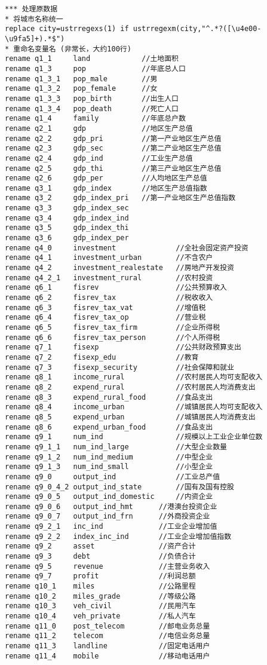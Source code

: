 \begin{lstlisting}[frame=single]
*** 处理原数据
* 将城市名称统一
replace city=ustrregexs(1) if ustrregexm(city,"^.*?([\u4e00-\u9fa5]+).*$")
* 重命名变量名 (非常长，大约100行)
rename q1_1		land			//土地面积
rename q1_3		pop				//年底总人口
rename q1_3_1	pop_male		//男
rename q1_3_2	pop_female		//女
rename q1_3_3	pop_birth		//出生人口
rename q1_3_4	pop_death		//死亡人口
rename q1_4		family			//年底总户数
rename q2_1		gdp				//地区生产总值
rename q2_2		gdp_pri			//第一产业地区生产总值
rename q2_3		gdp_sec			//第二产业地区生产总值
rename q2_4		gdp_ind			//工业生产总值
rename q2_5		gdp_thi			//第三产业地区生产总值
rename q2_6		gdp_per			//人均地区生产总值
rename q3_1 	gdp_index		//地区生产总值指数
rename q3_2		gdp_index_pri	//第一产业地区生产总值指数
rename q3_3 	gdp_index_sec
rename q3_4		gdp_index_ind
rename q3_5		gdp_index_thi
rename q3_6		gdp_index_per
rename q4_0		investment				//全社会固定资产投资
rename q4_1		investment_urban 		//不含农户
rename q4_2		investment_realestate	//房地产开发投资
rename q4_2_1	investment_rural		//农村投资
rename q6_1		fisrev					//公共预算收入
rename q6_2		fisrev_tax				//税收收入
rename q6_3		fisrev_tax_vat			//增值税
rename q6_4		fisrev_tax_op			//营业税
rename q6_5		fisrev_tax_firm			//企业所得税
rename q6_6		fisrev_tax_person		//个人所得税
rename q7_1		fisexp					//公共财政预算支出
rename q7_2		fisexp_edu				//教育
rename q7_3 	fisexp_security			//社会保障和就业
rename q8_1		income_rural			//农村居民人均可支配收入
rename q8_2		expend_rural			//农村居民人均消费支出
rename q8_3		expend_rural_food		//食品支出
rename q8_4		income_urban			//城镇居民人均可支配收入
rename q8_5		expend_urban			//城镇居民人均消费支出
rename q8_6		expend_urban_food		//食品支出
rename q9_1		num_ind					//规模以上工业企业单位数
rename q9_1_1	num_ind_large			//大型企业数量
rename q9_1_2	num_ind_medium			//中型企业
rename q9_1_3	num_ind_small			//小型企业
rename q9_0		output_ind				//工业总产值
rename q9_0_4_2	output_ind_state		//国有及国有控股
rename q9_0_5	output_ind_domestic		//内资企业
rename q9_0_6	output_ind_hmt		//港澳台投资企业
rename q9_0_7	output_ind_frn		//外商投资企业
rename q9_2_1	inc_ind				//工业企业增加值
rename q9_2_2	index_inc_ind		//工业企业增加值指数
rename q9_2		asset				//资产合计
rename q9_3		debt				//负债合计
rename q9_5		revenue				//主营业务收入
rename q9_7		profit				//利润总额
rename q10_1	miles				//公路里程
rename q10_2	miles_grade			//等级公路
rename q10_3	veh_civil			//民用汽车
rename q10_4	veh_private			//私人汽车
rename q11_0	post_telecom		//邮电业务总量
rename q11_2	telecom				//电信业务总量
rename q11_3	landline			//固定电话用户
rename q11_4	mobile				//移动电话用户

\end{lstlisting}
